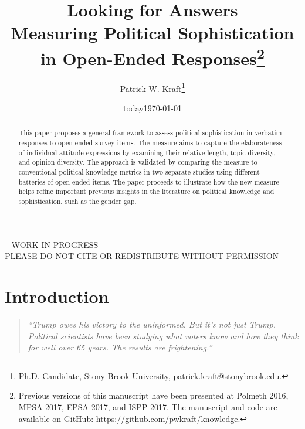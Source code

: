 \documentclass[12pt]{article}
\author{Patrick W. Kraft\footnote{Ph.D. Candidate, Stony Brook University, \href{mailto:patrick.kraft@stonybrook.edu}{patrick.kraft@stonybrook.edu}.
}}
\date{today}
\title{Looking for Answers\\
\large{Measuring Political Sophistication in Open-Ended Responses}\footnote{Previous versions of this manuscript have been presented at Polmeth 2016, MPSA 2017, EPSA 2017, and ISPP 2017.
The manuscript and code are available on GitHub: \url{https://github.com/pwkraft/knowledge}.}
}
\date{\today}
\begin{document}
\maketitle\doublespacing\thispagestyle{empty}

\begin{center}
-- WORK IN PROGRESS -- \\
PLEASE DO NOT CITE OR REDISTRIBUTE WITHOUT PERMISSION
\end{center} 

\hfill
\begin{abstract}\singlespacing
This paper proposes a general framework to assess political sophistication in verbatim responses to open-ended survey items. The measure aims to capture the elaborateness of individual attitude expressions by examining their relative length, topic diversity, and opinion diversity. The approach is validated by comparing the measure to conventional political knowledge metrics in two separate studies using different batteries of open-ended items. The paper proceeds to illustrate how the new measure helps refine important previous insights in the literature on political knowledge and sophistication, such as the gender gap.


\end{abstract}
\hfill
\newpage\setcounter{page}{1}


\section*{Introduction}

\begin{quote}\singlespacing
\textit{``Trump owes his victory to the uninformed. But it's not just Trump. Political scientists have been studying what voters know and how they think for well over 65 years. The results are frightening.''}
\end{quote}
\end{document}
